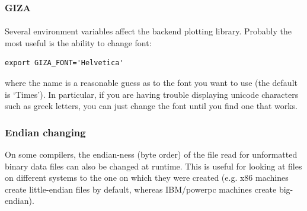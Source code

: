 \documentclass[a4paper,10pt]{article}
\newcommand{\splash}{\textsc{splash }}
\newcommand{\giza}{\textsc{giza }}
\begin{document}
%

\subsection{\giza}
Several environment variables affect the backend plotting library. Probably the most useful is the ability to change font:
\begin{verbatim}
export GIZA_FONT='Helvetica'
\end{verbatim}
where the name is a reasonable guess as to the font you want to use (the default is `Times'). In particular, if you are having trouble displaying unicode characters such as greek letters, you can just change the font until you find one that works.

\subsubsection{ Endian changing}
 On some compilers, the endian-ness (byte order) of the file read for unformatted binary data files can also be changed at runtime. This is useful for looking at files on different systems to the one on which they were created (e.g. x86 machines create little-endian files by default, whereas IBM/powerpc machines create big-endian).
\end{document}
